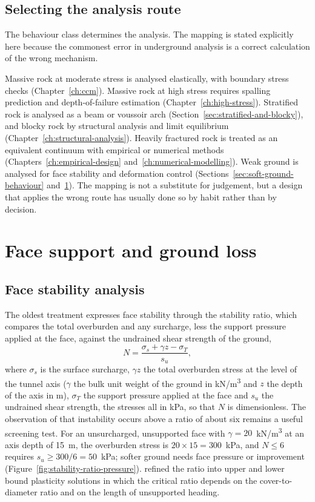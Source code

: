 \subsection{Selecting the analysis route}
\label{sec:analysis-route}

The behaviour class determines the analysis. The mapping is stated
explicitly here because the commonest error in
underground analysis is a correct calculation of
the wrong mechanism.

Massive rock at moderate stress is analysed elastically, with
boundary stress checks (Chapter~\ref{ch:ccm}). Massive rock at
high stress requires spalling prediction and depth-of-failure estimation
(Chapter~\ref{ch:high-stress}). Stratified rock is analysed as a beam or voussoir arch
(Section~\ref{sec:stratified-and-blocky}), and blocky rock by structural analysis and
limit equilibrium (Chapter~\ref{ch:structural-analysis}). Heavily fractured rock is treated as an
equivalent continuum with empirical or numerical methods
(Chapters~\ref{ch:empirical-design} and~\ref{ch:numerical-modelling}). Weak
ground is analysed for face stability and deformation control
(Sections~\ref{sec:soft-ground-behaviour} and~\ref{sec:face-support}). The mapping is not a substitute
for judgement, but a design that applies the wrong route has usually done so
by habit rather than by decision.

\section{Face support and ground loss}
\label{sec:face-support}

\subsection{Face stability analysis}
\label{sec:face-stability-analysis}

The oldest treatment expresses face stability through the stability ratio,
which compares the total overburden and any surcharge, less the support
pressure applied at the face, against the undrained shear strength of the
ground,
\[
N = \frac{\sigma_s + \gamma z - \sigma_T}{s_u} ,
\]
where $\sigma_s$ is the surface surcharge, $\gamma z$ the total overburden
stress at the level of the tunnel axis ($\gamma$ the bulk unit weight of the
ground in kN/m\textsuperscript{3} and $z$ the depth of the axis in m),
$\sigma_T$ the support pressure applied at the face and $s_u$ the undrained
shear strength, the stresses all in kPa, so that $N$ is dimensionless. The observation of
\citet{broms1967stability} that instability occurs above a ratio of about six
remains a useful screening test. For an unsurcharged, unsupported face with
$\gamma = 20$~kN/m\textsuperscript{3} at an axis depth of 15~m, the overburden
stress is $20 \times 15 = 300$~kPa, and $N \le 6$ requires
$s_u \ge 300/6 = 50$~kPa; softer ground needs face pressure or
improvement (Figure~\ref{fig:stability-ratio-pressure}). \citet{davis1980stability}
refined the ratio into upper and lower bound plasticity solutions in
which the critical ratio depends on the cover-to-diameter ratio and on the
length of unsupported heading.

